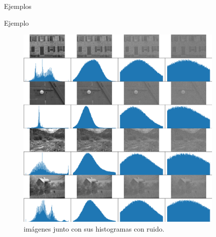 \documentclass{beamer}
\begin{document}
\begin{frame}{Ejemplos}
    \begin{block}{Ejemplo}
        \begin{figure}[H]
            \centering
            \includegraphics[width=0.9\textwidth]{img_hist_noise.png}
            \caption{im\'agenes junto con sus histogramas con ruido.}
            \label{fig:img_hist_ruido}
    \end{figure}
    \end{block}
\end{frame}
\end{document}
